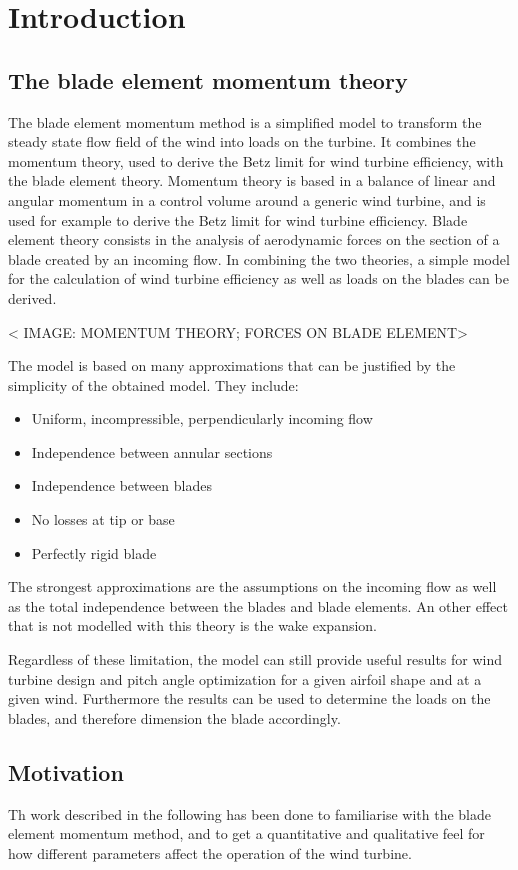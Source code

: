 \chapter{Introduction}

\section{The blade element momentum theory}

The blade element momentum method is a simplified model to transform the steady state flow field of the wind into loads on the turbine. It combines the momentum theory, used to derive the Betz limit for wind turbine efficiency, with the blade element theory. Momentum theory is based in a balance of linear and angular momentum in a control volume around a generic wind turbine, and is used for example to derive the Betz limit for wind turbine efficiency. Blade element theory consists in the analysis of aerodynamic forces on the section of a blade created by an incoming flow. In combining the two theories, a simple model for the calculation of wind turbine efficiency as well as loads on the blades can be derived.

< IMAGE: MOMENTUM THEORY; FORCES ON BLADE ELEMENT>

The model is based on many approximations that can be justified by the simplicity of the obtained model. They include:
\begin{itemize}
	\item Uniform, incompressible, perpendicularly incoming flow
	\item Independence between annular sections
	\item Independence between blades
	\item No losses at tip or base
	\item Perfectly rigid blade
\end{itemize}

The strongest approximations are the assumptions on the incoming flow as well as the total independence between the blades and blade elements. An other effect that is not modelled with this theory is the wake expansion.

Regardless of these limitation, the model can still provide useful results for wind turbine design and pitch angle optimization for a given airfoil shape and at a given wind. Furthermore the results can be used to determine the loads on the blades, and therefore dimension the blade accordingly.\cite{manwell2010wind}

\section{Motivation}

Th work described in the following has been done to familiarise with the blade element momentum method, and to get a quantitative and qualitative feel for how different parameters affect the operation of the wind turbine.